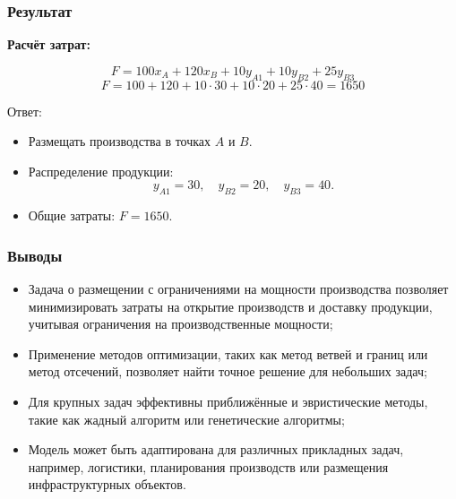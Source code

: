 \documentclass[12pt]{beamer}
\begin{document}
    \begin{frame}
        \frametitle{Результат}
    
        \textbf{Расчёт затрат:}

        $$F = 100x_A + 120x_B + 10y_{A1} + 10y_{B2} + 25y_{B3}$$
        $$F = 100 + 120 + 10 \cdot 30 + 10 \cdot 20 + 25 \cdot 40 = 1650$$

        \begin{block}{Ответ:}
            \begin{itemize}
                \item Размещать производства в точках \( A \) и \( B \).
                \item Распределение продукции:
                \[
                y_{A1} = 30, \quad y_{B2} = 20, \quad y_{B3} = 40.
                \]
                \item Общие затраты: \( F = 1650 \).
            \end{itemize}    
        \end{block}

    \end{frame}

    \begin{frame}
        \frametitle{Выводы}
    
        \begin{itemize}
            \item Задача о размещении с ограничениями на мощности производства позволяет минимизировать затраты на открытие производств и доставку продукции, учитывая ограничения на производственные мощности;
            \item Применение методов оптимизации, таких как метод ветвей и границ или метод отсечений, позволяет найти точное решение для небольших задач;
            \item Для крупных задач эффективны приближённые и эвристические методы, такие как жадный алгоритм или генетические алгоритмы;
            \item Модель может быть адаптирована для различных прикладных задач, например, логистики, планирования производств или размещения инфраструктурных объектов.
        \end{itemize}
    
    \end{frame}
\end{document}
